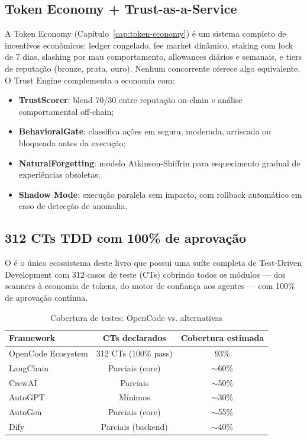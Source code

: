 \subsection{Token Economy + Trust-as-a-Service}
A Token Economy (Capítulo~\ref{cap:token-economy}) é um sistema completo
de incentivos econômicos: ledger congelado, fee market dinâmico, staking
com lock de 7 dias, slashing por mau comportamento, allowances diários
e semanais, e tiers de reputação (bronze, prata, ouro). Nenhum
concorrente oferece algo equivalente.
O Trust Engine complementa a economia com:
\begin{itemize}
\item \textbf{TrustScorer}: blend 70/30 entre reputação on-chain
e análise comportamental off-chain;
\item \textbf{BehavioralGate}: classifica ações em segura, moderada,
arriscada ou bloqueada antes da execução;
\item \textbf{NaturalForgetting}: modelo Atkinson-Shiffrin para
esquecimento gradual de experiências obsoletas;
\item \textbf{Shadow Mode}: execução paralela sem impacto, com
rollback automático em caso de detecção de anomalia.
\end{itemize}
\subsection{312 CTs TDD com 100\% de aprovação}
O \opencodeeco{} é o único ecossistema deste livro que possui uma suíte
completa de Test-Driven Development com 312 casos de teste (CTs)
cobrindo todos os módulos --- dos scanners à economia de tokens, do
motor de confiança aos agentes --- com 100\% de aprovação contínua.
\begin{table}[htb]
\centering
\caption{Cobertura de testes: OpenCode vs. alternativas}
\label{tab:testes}
\begin{tabular}{lcc}
\toprule
\textbf{Framework} & \textbf{CTs declarados} & \textbf{Cobertura estimada} \\
\midrule
OpenCode Ecosystem & 312 CTs (100\% pass) & 93\% \\
LangChain & Parciais (core) & $\sim$60\% \\
CrewAI & Parciais & $\sim$50\% \\
AutoGPT & Mínimos & $\sim$30\% \\
AutoGen & Parciais (core) & $\sim$55\% \\
Dify & Parciais (backend) & $\sim$40\% \\
\bottomrule
\end{tabular}
\end{table}
